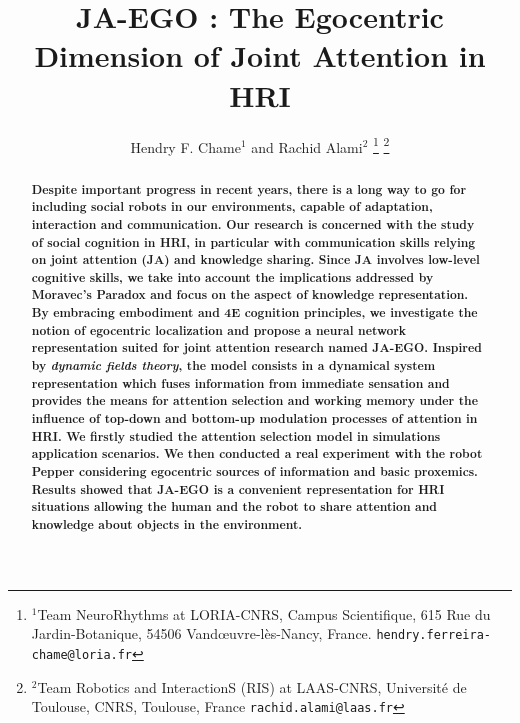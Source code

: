 \documentclass[letterpaper, 10 pt, conference]{ieeeconf}  %
\title{\LARGE \bf
	JA-EGO : The Egocentric Dimension of Joint Attention in HRI
}
\author{Hendry F. Chame$^{1}$ and Rachid Alami$^{2}$%
	\thanks{$^{1}$Team NeuroRhythms at LORIA-CNRS, Campus Scientifique, 615 Rue du Jardin-Botanique, 54506 Vand\oe uvre-l\`es-Nancy, France.
		{\tt\small hendry.ferreira-chame@loria.fr}}%
	\thanks{$^{2}$Team Robotics and InteractionS (RIS) at LAAS-CNRS, Universit\'e de Toulouse, CNRS, Toulouse, France
		{\tt\small rachid.alami@laas.fr}}%
}
\begin{document}
		
	
	\maketitle
	\thispagestyle{empty}
	\pagestyle{empty}
	
	
	\begin{abstract}
		
		\small \bf Despite important progress in recent years, there is a long way to go for including social robots in our environments, capable of adaptation, interaction and communication. Our research is concerned with the study of social cognition in HRI, in particular with communication skills relying on joint attention (JA) and knowledge sharing. Since JA involves low-level cognitive skills, we take into account the implications addressed by Moravec's Paradox and focus on the aspect of knowledge representation. By embracing embodiment and 4E cognition principles, we investigate the notion of egocentric localization and propose a neural network representation suited for joint attention research named JA-EGO. Inspired by \textit{dynamic fields theory}, the model consists in a dynamical system representation which fuses information from immediate sensation and provides the means for attention selection and working memory under the influence of top-down and bottom-up modulation processes of attention in HRI. We firstly studied the attention selection model in simulations application scenarios. We then conducted a real experiment with the robot Pepper considering egocentric sources of information and basic proxemics. Results showed that JA-EGO is a convenient representation for HRI situations allowing the human and the robot to share attention and knowledge about objects in the environment. 
		

\end{abstract}
\end{document}
